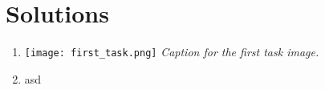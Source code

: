 \documentclass{article}
\begin{document}

\section*{Solutions}
\begin{enumerate}
    \item 
        \begin{center}
        \texttt{[image: first\_task.png]} %
        \textit{Caption for the first task image.} %

    \end{center}
        \item asd
\end{enumerate}
\end{document}
